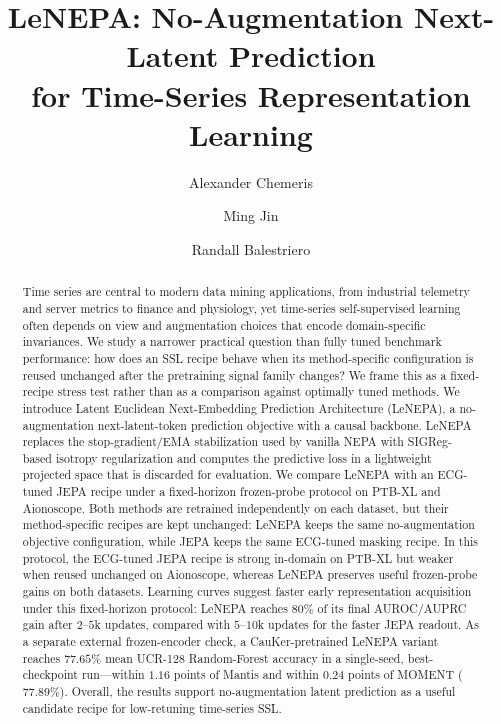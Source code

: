 \documentclass[sigconf,anonymous,review]{acmart}
\title[LeNEPA: No-Augmentation Next-Latent Prediction for Time Series]{\texorpdfstring{LeNEPA: No-Augmentation Next-Latent Prediction\\for Time-Series Representation Learning}{LeNEPA: No-Augmentation Next-Latent Prediction for Time-Series Representation Learning}}
\author{Alexander Chemeris}
\affiliation{
  \institution{Langotime}
  \country{South Africa}
}
\author{Ming Jin}
\affiliation{
  \institution{Griffith University}
  \country{Australia}
}
\author{Randall Balestriero}
\affiliation{
  \institution{Brown University}
  \country{United States}
}
\begin{document}
\begin{abstract}
Time series are central to modern data mining applications, from industrial telemetry and server metrics to finance and physiology, yet time-series self-supervised learning often depends on view and augmentation choices that encode domain-specific invariances.
We study a narrower practical question than fully tuned benchmark performance: how does an SSL recipe behave when its method-specific configuration is reused unchanged after the pretraining signal family changes?
We frame this as a fixed-recipe stress test rather than as a comparison against optimally tuned methods.
We introduce Latent Euclidean Next-Embedding Prediction Architecture (LeNEPA), a no-augmentation next-latent-token prediction objective with a causal backbone.
LeNEPA replaces the stop-gradient/EMA stabilization used by vanilla NEPA with SIGReg-based isotropy regularization and computes the predictive loss in a lightweight projected space that is discarded for evaluation.
We compare LeNEPA with an ECG-tuned JEPA recipe under a fixed-horizon frozen-probe protocol on PTB-XL and Aionoscope.
Both methods are retrained independently on each dataset, but their method-specific recipes are kept unchanged: LeNEPA keeps the same no-augmentation objective configuration, while JEPA keeps the same ECG-tuned masking recipe.
In this protocol, the ECG-tuned JEPA recipe is strong in-domain on PTB-XL but weaker when reused unchanged on Aionoscope, whereas LeNEPA preserves useful frozen-probe gains on both datasets.
Learning curves suggest faster early representation acquisition under this fixed-horizon protocol: LeNEPA reaches $80\%$ of its final AUROC/AUPRC gain after $2$--$5$k updates, compared with $5$--$10$k updates for the faster JEPA readout.
As a separate external frozen-encoder check, a CauKer-pretrained LeNEPA variant reaches $77.65\%$ mean UCR-128 Random-Forest accuracy in a single-seed, best-checkpoint run---within $1.16$ points of Mantis and within $0.24$ points of MOMENT ($77.89\%$).
Overall, the results support no-augmentation latent prediction as a useful candidate recipe for low-retuning time-series SSL.
\end{abstract}


\end{document}
